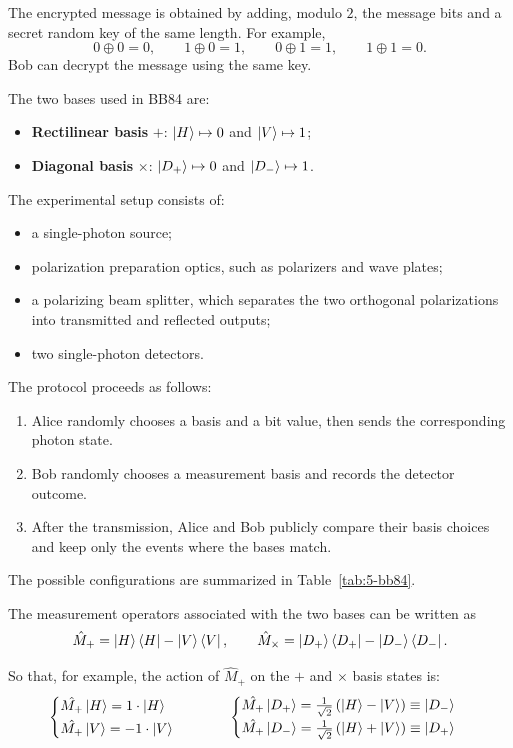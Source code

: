 The encrypted message is obtained by adding, modulo $2$, the message bits and a secret random key of the same length. For example,
\[
0 \oplus 0 = 0,\qquad 1 \oplus 0 = 1,\qquad 0 \oplus 1 = 1,\qquad 1 \oplus 1 = 0.
\]
Bob can decrypt the message using the same key.

The two bases used in BB84 are:
\begin{itemize}
    \item \textbf{Rectilinear basis} $+$: $\ket{H} \mapsto 0$ and $\ket{V} \mapsto 1$;
    \item \textbf{Diagonal basis} $\times$: $\ket{D_+} \mapsto 0$ and $\ket{D_-} \mapsto 1$.
\end{itemize}
The experimental setup consists of:
\begin{itemize}
    \item[--] a single-photon source;
    \item[--] polarization preparation optics, such as polarizers and wave plates;
    \item[--] a polarizing beam splitter, which separates the two orthogonal polarizations into transmitted and reflected outputs;
    \item[--] two single-photon detectors.
\end{itemize}
The protocol proceeds as follows:
\begin{enumerate}
    \item Alice randomly chooses a basis and a bit value, then sends the corresponding photon state.
    \item Bob randomly chooses a measurement basis and records the detector outcome.
    \item After the transmission, Alice and Bob publicly compare their basis choices and keep only the events where the bases match. 
\end{enumerate}
The possible configurations are summarized in Table~\ref{tab:5-bb84}.



The measurement operators associated with the two bases can be written as
\begin{equation}\label{5-measurement-operators}
\hat{M}_{+} = \ket{H}\bra{H} - \ket{V}\bra{V},
\qquad
\hat{M}_{\times} = \ket{D_+}\bra{D_+} - \ket{D_-}\bra{D_-}.
\end{equation}

So that, for example, the action of $\hat{M}_+$ on the $+$ and $\times$ basis states is:
\begin{equation}\label{5-measurement-operators-action}
\begin{cases}
\hat{M_+} \ket{H} = 1 \cdot \ket{H}\\[0.5ex]
\hat{M_+} \ket{V} = -1 \cdot \ket{V}
\end{cases}
\hspace{1cm}
\begin{cases}
\hat{M_+} \ket{D_+} = 
\tfrac{1}{\sqrt{2}} \left(\ket{H} -\ket{V}\right) \equiv \ket{D_-}\\[0.5ex]
\hat{M_+} \ket{D_-} = 
\tfrac{1}{\sqrt{2}} \left(\ket{H} +\ket{V}\right) \equiv \ket{D_+}
\end{cases}
\end{equation}

